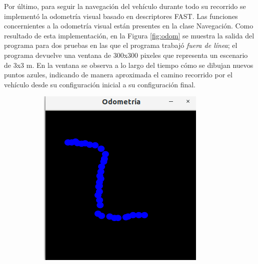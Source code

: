 \par Por último, para seguir la navegación del vehículo durante todo su recorrido se implementó la odometría visual basado en descriptores FAST. Las funciones concernientes a la odometría visual están presentes en la clase Navegación. Como resultado de esta implementación, en la Figura \ref{fig:odom} se muestra la salida del programa para dos pruebas en las que el programa trabajó {\it fuera de línea}; el programa devuelve una ventana de 300x300 pixeles que representa un escenario de 3x3 m. En la ventana se observa a lo largo del tiempo cómo se dibujan nuevos puntos azules, indicando de manera aproximada el camino recorrido por el vehículo desde su configuración inicial a su configuración final.
\begin{figure}[htbp!]
	\centering
	\begin{subfigure}[htbp!]{0.4\textwidth}
		\includegraphics[width=\textwidth]{./Figuras/Odo1}
	\end{subfigure}
	\begin{subfigure}[htbp!]{0.4\textwidth}

\end{subfigure}
\end{figure}
